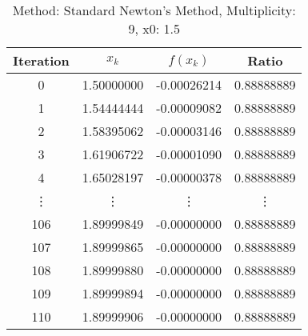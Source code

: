\begin{table}
\centering
\caption{Method: Standard Newton's Method, Multiplicity: 9, x0: 1.5}
\label{tab:table_Standard_Newton's_Method_9_1_5}
\begin{tabular}{c c c c}
\toprule
Iteration &      $x_k$ &    $f(x_k)$ &      Ratio \\
\midrule
        0 & 1.50000000 & -0.00026214 & 0.88888889 \\
        1 & 1.54444444 & -0.00009082 & 0.88888889 \\
        2 & 1.58395062 & -0.00003146 & 0.88888889 \\
        3 & 1.61906722 & -0.00001090 & 0.88888889 \\
        4 & 1.65028197 & -0.00000378 & 0.88888889 \\
   \vdots &     \vdots &      \vdots &     \vdots \\
      106 & 1.89999849 & -0.00000000 & 0.88888889 \\
      107 & 1.89999865 & -0.00000000 & 0.88888889 \\
      108 & 1.89999880 & -0.00000000 & 0.88888889 \\
      109 & 1.89999894 & -0.00000000 & 0.88888889 \\
      110 & 1.89999906 & -0.00000000 & 0.88888889 \\
\bottomrule
\end{tabular}
\end{table}
